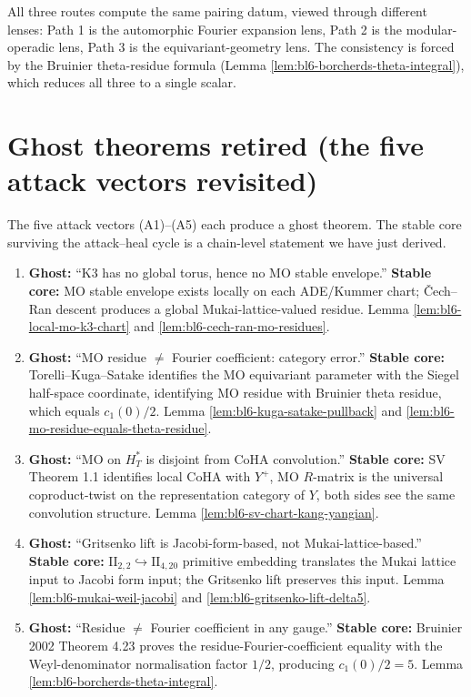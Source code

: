 All three routes compute the same pairing datum, viewed through
different lenses: Path 1 is the automorphic Fourier expansion
lens, Path 2 is the modular-operadic lens, Path 3 is the
equivariant-geometry lens. The consistency is forced by the
Bruinier theta-residue formula (Lemma
\ref{lem:bl6-borcherds-theta-integral}), which reduces all three
to a single scalar.

\section*{Ghost theorems retired (the five attack vectors revisited)}

The five attack vectors (A1)--(A5) each produce a ghost theorem.
The stable core surviving the attack--heal cycle is a
chain-level statement we have just derived.

\begin{enumerate}
\item[(A1)]
   \textbf{Ghost:} ``K3 has no global torus, hence no MO stable
   envelope.''
   \textbf{Stable core:} MO stable envelope exists locally on each
   ADE/Kummer chart; \v Cech--Ran descent produces a global
   Mukai-lattice-valued residue.  Lemma
   \ref{lem:bl6-local-mo-k3-chart} and
   \ref{lem:bl6-cech-ran-mo-residues}.

\item[(A2)]
   \textbf{Ghost:} ``MO residue $\ne$ Fourier coefficient: category
   error.''
   \textbf{Stable core:} Torelli--Kuga--Satake identifies the MO
   equivariant parameter with the Siegel half-space coordinate,
   identifying MO residue with Bruinier theta residue, which equals
   $c_{1}(0)/2$. Lemma \ref{lem:bl6-kuga-satake-pullback} and
   \ref{lem:bl6-mo-residue-equals-theta-residue}.

\item[(A3)]
   \textbf{Ghost:} ``MO on $H^*_T$ is disjoint from CoHA
   convolution.''
   \textbf{Stable core:} SV Theorem 1.1 identifies local CoHA with
   $Y^{+}$, MO $R$-matrix is the universal coproduct-twist on the
   representation category of $Y$, both sides see the same
   convolution structure.  Lemma
   \ref{lem:bl6-sv-chart-kang-yangian}.

\item[(A4)]
   \textbf{Ghost:} ``Gritsenko lift is Jacobi-form-based, not
   Mukai-lattice-based.''
   \textbf{Stable core:} $\mathrm{II}_{2,2} \hookrightarrow
   \mathrm{II}_{4, 20}$ primitive embedding translates the Mukai
   lattice input to Jacobi form input; the Gritsenko lift preserves
   this input.  Lemma \ref{lem:bl6-mukai-weil-jacobi} and
   \ref{lem:bl6-gritsenko-lift-delta5}.

\item[(A5)]
   \textbf{Ghost:} ``Residue $\ne$ Fourier coefficient in any gauge.''
   \textbf{Stable core:} Bruinier 2002 Theorem 4.23 proves the
   residue-Fourier-coefficient equality with the Weyl-denominator
   normalisation factor $1/2$, producing $c_{1}(0)/2 = 5$. Lemma
   \ref{lem:bl6-borcherds-theta-integral}.
\end{enumerate}

